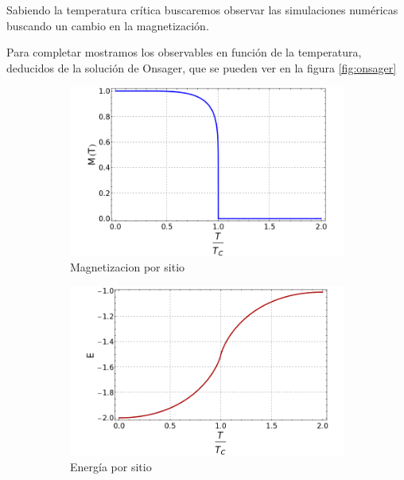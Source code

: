 \documentclass[12pt,a4paper]{article}
\begin{document}
Sabiendo la temperatura crítica buscaremos observar las simulaciones numéricas buscando un cambio en la magnetización.

Para completar mostramos los observables en función de la temperatura, deducidos de la solución de Onsager, que se pueden ver en la figura \ref{fig:onsager}

\begin{figure}[H]
\begin{subfigure}[c]{0.45\textwidth}
\centering
\includegraphics[width=\textwidth]{teoricos/m_onsager.png}
\caption{Magnetizacion por sitio}
\label{fig:m_onsager}
\end{subfigure}
\begin{subfigure}[c]{0.45\textwidth}
\centering
\includegraphics[width=\textwidth]{teoricos/e_onsager.png}
\caption{Energía por sitio}
\label{fig:e_onsager}
\end{subfigure}
\\
\centering
\begin{subfigure}[c]{0.45\textwidth}

\end{subfigure}
\end{figure}
\end{document}
